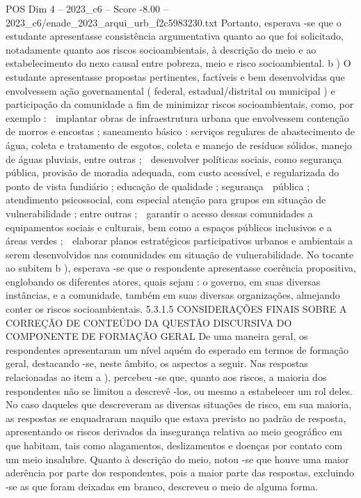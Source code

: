\begin{textsample}{POS Dim 4 – 2023\_c6 – Score -8.00 – 2023\_c6/enade\_2023\_arqui\_urb\_f2c5983230.txt}
Portanto, esperava -se que o estudante apresentasse consistência argumentativa quanto ao que foi solicitado, notadamente quanto aos riscos socioambientais, à descrição do meio e ao estabelecimento do nexo causal entre pobreza, meio e risco socioambiental. b ) O estudante apresentasse propostas pertinentes, factíveis e bem desenvolvidas que envolvessem ação governamental ( federal, estadual/distrital ou municipal ) e participação da comunidade a fim de minimizar riscos socioambientais, como, por exemplo :  implantar obras de infraestrutura urbana que envolvessem contenção de morros e encostas ; saneamento básico : serviços regulares de abastecimento de água, coleta e tratamento de esgotos, coleta e manejo de resíduos sólidos, manejo de águas pluviais, entre outras ;  desenvolver políticas sociais, como segurança pública, provisão de moradia adequada, com custo acessível, e regularizada do ponto de vista fundiário ; educação de qualidade ; segurança  pública ; atendimento psicossocial, com especial atenção para grupos em situação de vulnerabilidade ; entre outras ;  garantir o acesso dessas comunidades a equipamentos sociais e culturais, bem como a espaços públicos inclusivos e a áreas verdes ;  elaborar planos estratégicos participativos urbanos e ambientais a serem desenvolvidos nas comunidades em situação de vulnerabilidade.
No tocante ao subitem b ), esperava -se que o respondente apresentasse coerência propositiva, englobando os diferentes atores, quais sejam : o governo, em suas diversas instâncias, e a comunidade, também em suas diversas organizações, almejando conter os riscos socioambientais. 5.3.1.5 CONSIDERAÇÕES FINAIS SOBRE A CORREÇÃO DE CONTEÚDO DA QUESTÃO DISCURSIVA DO COMPONENTE DE FORMAÇÃO GERAL De uma maneira geral, os respondentes apresentaram um nível aquém do esperado em termos de formação geral, destacando -se, neste âmbito, os aspectos a seguir.
Nas respostas relacionadas ao item a ), percebeu -se que, quanto aos riscos, a maioria dos respondentes não se limitou a descrevê -los, ou mesmo a estabelecer um rol deles.
No caso daqueles que descreveram as diversas situações de risco, em sua maioria, as respostas se enquadraram naquilo que estava previsto no padrão de resposta, apresentando os riscos derivados da insegurança relativa ao meio geográfico em que habitam, tais como alagamentos, deslizamentos e doenças por contato com um meio insalubre.
Quanto à descrição do meio, notou -se que houve uma maior aderência por parte dos respondentes, pois a maior parte das respostas, excluindo -se as que foram deixadas em branco, descreveu o meio de alguma forma.

\end{textsample}
